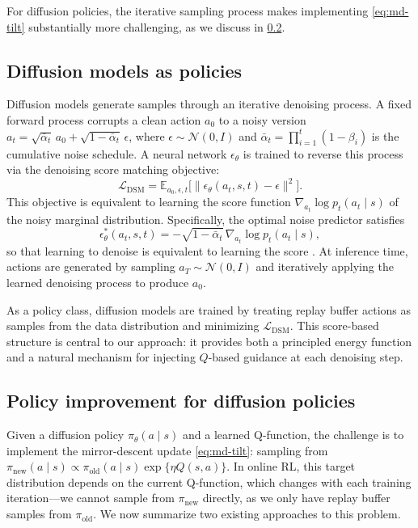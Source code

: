 \documentclass{article}
\theoremstyle{plain}
\theoremstyle{definition}
\theoremstyle{remark}
\newcommand{\E}{\mathbb{E}}
\begin{document}
For diffusion policies, the iterative sampling process makes implementing \cref{eq:md-tilt} substantially more challenging, as we discuss in \cref{sec:policy-improvement-bg}.

\subsection{Diffusion models as policies}
\label{sec:diffusion-background}

Diffusion models \citep{ho2020denoising,song2021sde} generate samples through an iterative denoising process.
A fixed forward process corrupts a clean action $a_0$ to a noisy version $a_t = \sqrt{\bar{\alpha}_t}\, a_0 + \sqrt{1-\bar{\alpha}_t}\, \epsilon$, where $\epsilon \sim \mathcal{N}(0,I)$ and $\bar{\alpha}_t = \prod_{i=1}^t (1-\beta_i)$ is the cumulative noise schedule.
A neural network $\epsilon_\theta$ is trained to reverse this process via the denoising score matching objective:
\begin{equation}
  \mathcal{L}_{\text{DSM}} = \E_{a_0, \epsilon, t}\bigl[\|\epsilon_\theta(a_t, s, t) - \epsilon\|^2\bigr].
  \label{eq:dsm}
\end{equation}
This objective is equivalent to learning the score function $\nabla_{a_t} \log p_t(a_t \mid s)$ of the noisy marginal distribution.
Specifically, the optimal noise predictor satisfies
\begin{equation}
  \epsilon_\theta^*(a_t, s, t) = -\sqrt{1-\bar{\alpha}_t}\, \nabla_{a_t} \log p_t(a_t \mid s),
  \label{eq:score-noise}
\end{equation}
so that learning to denoise is equivalent to learning the score \citep{ho2020denoising}.
At inference time, actions are generated by sampling $a_T \sim \mathcal{N}(0,I)$ and iteratively applying the learned denoising process to produce $a_0$.

As a policy class, diffusion models are trained by treating replay buffer actions as samples from the data distribution and minimizing $\mathcal{L}_{\text{DSM}}$.
This score-based structure is central to our approach: it provides both a principled energy function and a natural mechanism for injecting $Q$-based guidance at each denoising step.

\subsection{Policy improvement for diffusion policies}
\label{sec:policy-improvement-bg}

Given a diffusion policy $\pi_\theta(a \mid s)$ and a learned Q-function, the challenge is to implement the mirror-descent update \cref{eq:md-tilt}: sampling from $\pi_{\mathrm{new}}(a\mid s) \propto \pi_\mathrm{old}(a\mid s) \exp\{\eta Q(s,a)\}$.
In online RL, this target distribution depends on the current Q-function, which changes with each training iteration---we cannot sample from $\pi_{\mathrm{new}}$ directly, as we only have replay buffer samples from $\pi_{\mathrm{old}}$.
We now summarize two existing approaches to this problem.
\end{document}
